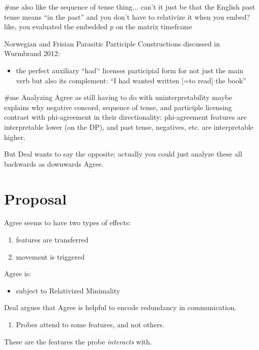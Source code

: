 \#me also like the sequence of tense thing... can't it just be that the English past tense means ``in the past'' and you don't have to relativize it when you embed? like, you evaluated the embedded \textit{p} on the matrix timeframe

Norwegian and Frisian Parasitic Participle Constructions discussed in Wurmbrand 2012:

\begin{itemize}
  \item the perfect auxiliary ``had'` licenses participial form for not just the main verb but also its complement: ``I had wanted written [=to read] the book''
\end{itemize}

\#me Analyzing Agree as still having to do with uninterpretability maybe explains why negative concord, sequence of tense, and participle licensing contrast with phi-agreement in their directionality: phi-agreement features are interpretable lower (on the DP), and past tense, negatives, etc. are interpretable higher.

But Deal wants to say the opposite: actually you could just analyze these all backwards as downwards Agree.

\section*{Proposal}

Agree seems to have two types of effects:

\begin{enumerate}
  \item features are transferred
  \item movement is triggered
\end{enumerate}

Agree is:

\begin{itemize}
  \item subject to Relativized Minimality
\end{itemize}

Deal argues that Agree is helpful to encode redundancy in communication.

\bigskip

\begin{enumerate}
  \item Probes attend to some features, and not others.
\end{enumerate}
These are the features the probe \textit{interacts} with.

